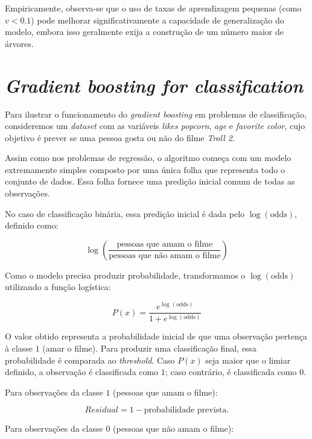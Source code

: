 \documentclass{article}
\begin{document}
Empiricamente, observa-se que o uso de taxas de aprendizagem pequenas
(como $v < 0.1$) pode melhorar significativamente a capacidade de
generalização do modelo, embora isso geralmente exija a construção
de um número maior de árvores.

\section{\textit{Gradient boosting for classification}}

Para ilustrar o funcionamento do \textit{gradient boosting} em
problemas de classificação, consideremos um \textit{dataset} com 
as variáveis \textit{likes popcorn}, \textit{age} e \textit{favorite color},
cujo objetivo é prever se uma pessoa gosta ou não do filme \textit{Troll 2}.

Assim como nos problemas de regressão, o algoritmo começa com um 
modelo extremamente simples composto por uma única folha que representa
todo o conjunto de dados. Essa folha fornece uma predição inicial
comum de todas as observações. 

No caso de classificação binária, essa predição inicial é dada pelo
$\log (\text{odds})$, definido como:

\begin{equation*}
    \log \left(\frac{\text{pessoas que amam o filme}}{\text{pessoas que não amam o filme}}\right)
\end{equation*}

Como o modelo precisa produzir probabilidade, transformamos 
o $\log(\text{odds})$ utilizando a função logística:

\begin{equation*}
    P(x) = \frac{e^{\log(\text{odds})}}{1 + e^{\log(\text{odds})}}
\end{equation*}

O valor obtido representa a probabilidade inicial de que uma 
observação pertença à classe $1$ (amar o filme). Para produzir 
uma classificação final, essa probabilidade é comparada ao 
\textit{threshold}. Caso $P(x)$ seja maior que o limiar definido, 
a observação é classificada como $1$; caso contrário, é classificada 
como $0$.

Para observações da classe $1$ (pessoas que amam o filme):

\begin{equation*}
    Residual = 1 - \text{probabilidade prevista}.
\end{equation*}

Para observações da classe $0$ (pessoas que não amam o filme):
\end{document}
